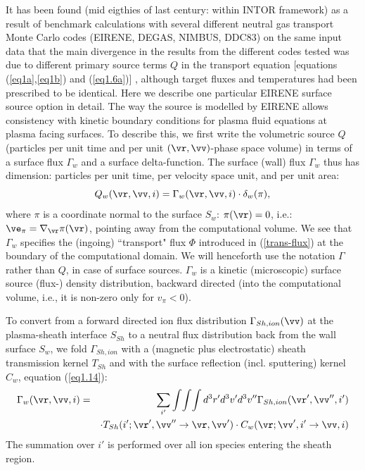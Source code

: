 It has been found (mid eigthies of last century: within INTOR framework) as a result of benchmark calculations with
several different neutral gas transport Monte Carlo codes (EIRENE, DEGAS, NIMBUS, DDC83) on the
same input data that the main divergence in the results from the
different codes tested was due to different primary source terms
$Q$ in the transport equation [equations (\ref{eq1a},\ref{eq1b}) and
(\ref{eq1.6a})] , although target fluxes and temperatures had been
prescribed to be identical. Here we describe one particular EIRENE
surface source option in detail. The way the source is modelled by
EIRENE allows  consistency with kinetic boundary
conditions for plasma fluid equations at plasma facing surfaces.
To describe this, we first write the volumetric source $Q$ (particles per unit time and per unit $(\vr,\vv)$-phase space volume)
in terms of a  surface flux $\Gamma_w$ and a surface delta-function. The
surface (wall) flux $\Gamma_w$ thus has dimension: particles per unit time, per velocity space unit, and per unit area:
\begin{equation}
Q_w( \vr , \vv , i )   = \Gamma_w (
\vr, \vv , i )    \cdot   \delta_w ( \pi )     ,
\label{eq1.22}
\end{equation}
where $\pi$ is a coordinate normal to the surface $S_w$:
$\pi(\vr)=0 $, i.e.: $\ve_{\pi} =
\nabla_{\vr}\pi(\vr)$, pointing away from the
computational volume.
We see that $\Gamma_w$ specifies the (ingoing) ``transport" flux $\Phi$ introduced in (\ref{trans-flux}) at the boundary of
the computational domain.
We will henceforth use the notation $\Gamma$ rather than $Q$, in case of surface sources.
$\Gamma_w$ is a kinetic (microscopic) surface source (flux-)
density distribution, backward directed (into the computational
volume, i.e., it is non-zero only for $v_\pi < 0$).



To convert from a forward directed ion flux distribution
$\Gamma_{Sh,ion}(\vv)$ at the plasma-sheath interface $S_{Sh}$ to a
neutral flux distribution back from the wall surface $S_w$, we
fold $\Gamma_{Sh,ion}$ with a (magnetic plus electrostatic) sheath transmission
kernel $T_{Sh}$ and with the surface reflection (incl. sputtering) kernel $C_w$,
equation (\ref{eq1.14}):
 \begin{eqnarray}
\Gamma_w ( \vr , \vv  , i )  & = & \sum_{i '}
\int\! \int\! \int d^3 r' d^3 v'  d^3
v'' \Gamma_{Sh,ion} ( \vr ' ,
\vv '' , i ' ) \nonumber\\
& & \cdot T_{Sh} (i ' ; \vr ' ,
\vv '' \rightarrow \vr , \vv  ' )
 \cdot  C_w ( \vr ;
\vv ' , i ' \rightarrow \vv , i )
\label{eq1.24}
\end{eqnarray}
The summation over $i '$ is performed over all ion species
entering the sheath region.

